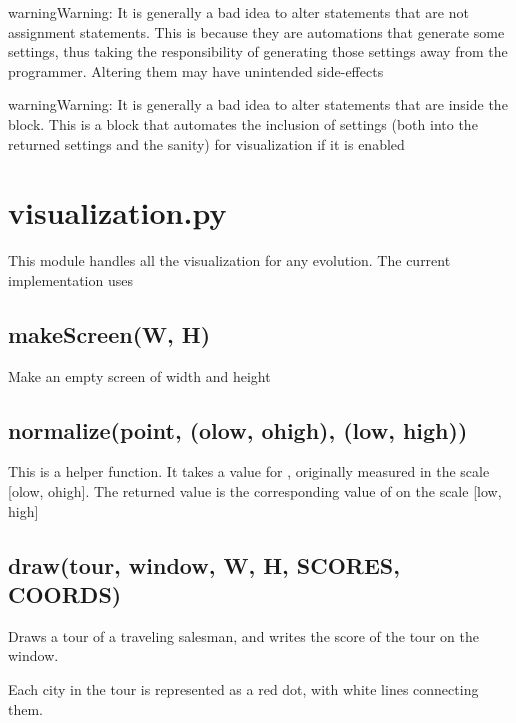 \documentclass[letterpaper,10pt,english]{sphinxmanual}
\begin{document}
\begin{notice}{warning}{Warning:}
It is generally a bad idea to alter statements that are not assignment statements. This is because they are automations that generate some settings, thus taking the responsibility of generating those settings away from the programmer. Altering them may have unintended side-effects
\end{notice}

\begin{notice}{warning}{Warning:}
It is generally a bad idea to alter statements that are inside the  block. This is a block that automates the inclusion of settings (both into the returned settings and the sanity) for visualization if it is enabled
\end{notice}


\chapter{visualization.py}
\label{visualization.py:visualization-py}\label{visualization.py::doc}
This module handles all the visualization for any evolution.
The current implementation uses 


\section{makeScreen(W, H)}
\label{visualization.py:makescreen-w-h}
Make an empty screen of width  and height 


\section{normalize(point, (olow, ohigh), (low, high))}
\label{visualization.py:normalize-point-olow-ohigh-low-high}
This is a helper function. It takes a value for , originally measured in the scale {[}olow, ohigh{]}.
The returned value is the corresponding value of  on the scale {[}low, high{]}


\section{draw(tour, window, W, H, SCORES, COORDS)}
\label{visualization.py:draw-tour-window-w-h-scores-coords}
Draws a tour of a traveling salesman, and writes the score of the tour on the window.

Each city in the tour is represented as a red dot, with white lines connecting them.
\end{document}
